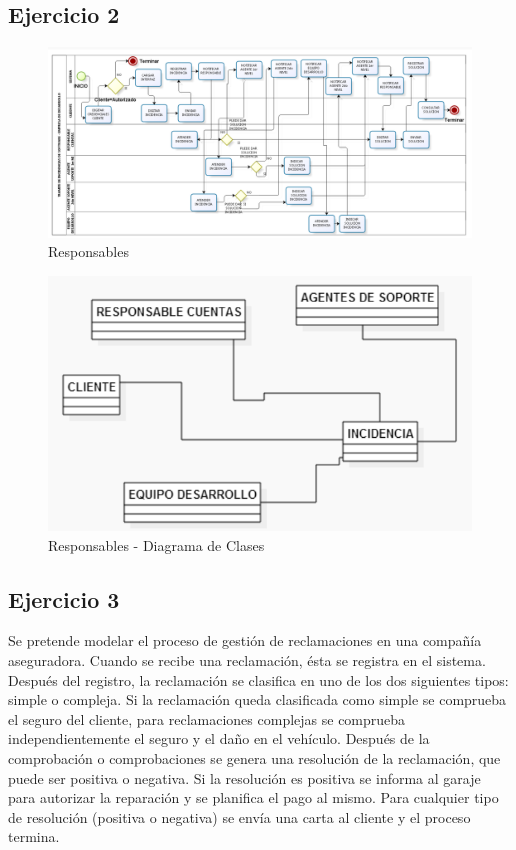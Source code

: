 \documentclass[12pt,letterpaper]{article}
\begin{document}
\subsection{\textbf{Ejercicio 2}}
	\begin{figure}[H]
		\centering
		\includegraphics[scale=0.5]{img/ej2.PNG}     
		\caption{Responsables}
	\label{fig:rc}
	\end{figure}
	\vspace{1cm}
	\begin{figure}[H]
		\centering
		\includegraphics[scale=1]{img/ej22.PNG}     
		\caption{Responsables - Diagrama de Clases}
	\label{fig:rc}
	\end{figure}
	\vspace{1cm}


\subsection{\textbf{Ejercicio 3}}
Se pretende modelar el proceso de gestión de reclamaciones en una compañía aseguradora. Cuando se recibe una reclamación, ésta se registra en el sistema. Después del registro, la reclamación se clasifica en uno de los dos siguientes tipos: simple o compleja. Si la reclamación queda clasificada como simple se comprueba el seguro del cliente, para reclamaciones complejas se comprueba independientemente el seguro y el daño en el vehículo. Después de la comprobación o comprobaciones se genera una resolución de la reclamación, que puede ser positiva o negativa. Si la resolución es positiva se informa al garaje para autorizar la reparación y se planifica el pago al mismo. Para cualquier tipo de resolución (positiva o negativa) se envía una carta al cliente y el proceso termina.\\
\end{document}

